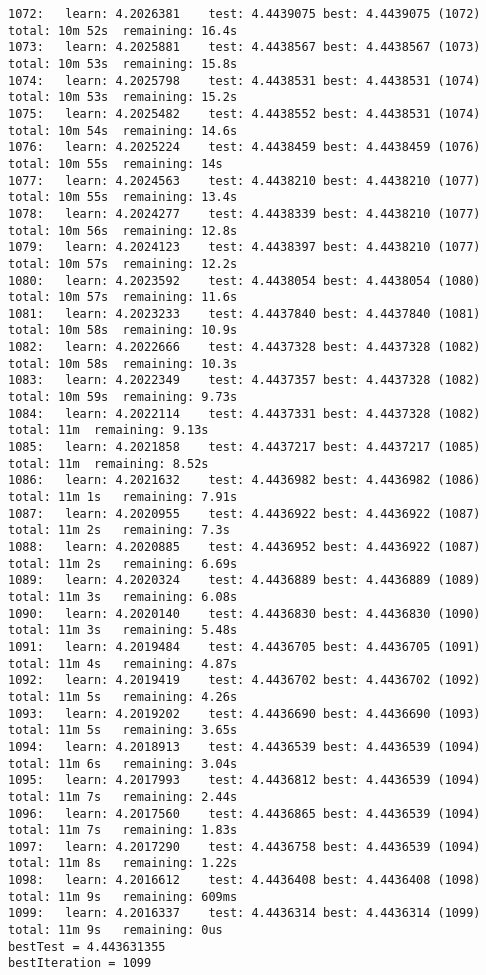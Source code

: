 \documentclass[11pt]{article}
\begin{document}
\begin{Verbatim}[commandchars=\\\{\}]
1072:	learn: 4.2026381	test: 4.4439075	best: 4.4439075 (1072)	total: 10m 52s	remaining: 16.4s
1073:	learn: 4.2025881	test: 4.4438567	best: 4.4438567 (1073)	total: 10m 53s	remaining: 15.8s
1074:	learn: 4.2025798	test: 4.4438531	best: 4.4438531 (1074)	total: 10m 53s	remaining: 15.2s
1075:	learn: 4.2025482	test: 4.4438552	best: 4.4438531 (1074)	total: 10m 54s	remaining: 14.6s
1076:	learn: 4.2025224	test: 4.4438459	best: 4.4438459 (1076)	total: 10m 55s	remaining: 14s
1077:	learn: 4.2024563	test: 4.4438210	best: 4.4438210 (1077)	total: 10m 55s	remaining: 13.4s
1078:	learn: 4.2024277	test: 4.4438339	best: 4.4438210 (1077)	total: 10m 56s	remaining: 12.8s
1079:	learn: 4.2024123	test: 4.4438397	best: 4.4438210 (1077)	total: 10m 57s	remaining: 12.2s
1080:	learn: 4.2023592	test: 4.4438054	best: 4.4438054 (1080)	total: 10m 57s	remaining: 11.6s
1081:	learn: 4.2023233	test: 4.4437840	best: 4.4437840 (1081)	total: 10m 58s	remaining: 10.9s
1082:	learn: 4.2022666	test: 4.4437328	best: 4.4437328 (1082)	total: 10m 58s	remaining: 10.3s
1083:	learn: 4.2022349	test: 4.4437357	best: 4.4437328 (1082)	total: 10m 59s	remaining: 9.73s
1084:	learn: 4.2022114	test: 4.4437331	best: 4.4437328 (1082)	total: 11m	remaining: 9.13s
1085:	learn: 4.2021858	test: 4.4437217	best: 4.4437217 (1085)	total: 11m	remaining: 8.52s
1086:	learn: 4.2021632	test: 4.4436982	best: 4.4436982 (1086)	total: 11m 1s	remaining: 7.91s
1087:	learn: 4.2020955	test: 4.4436922	best: 4.4436922 (1087)	total: 11m 2s	remaining: 7.3s
1088:	learn: 4.2020885	test: 4.4436952	best: 4.4436922 (1087)	total: 11m 2s	remaining: 6.69s
1089:	learn: 4.2020324	test: 4.4436889	best: 4.4436889 (1089)	total: 11m 3s	remaining: 6.08s
1090:	learn: 4.2020140	test: 4.4436830	best: 4.4436830 (1090)	total: 11m 3s	remaining: 5.48s
1091:	learn: 4.2019484	test: 4.4436705	best: 4.4436705 (1091)	total: 11m 4s	remaining: 4.87s
1092:	learn: 4.2019419	test: 4.4436702	best: 4.4436702 (1092)	total: 11m 5s	remaining: 4.26s
1093:	learn: 4.2019202	test: 4.4436690	best: 4.4436690 (1093)	total: 11m 5s	remaining: 3.65s
1094:	learn: 4.2018913	test: 4.4436539	best: 4.4436539 (1094)	total: 11m 6s	remaining: 3.04s
1095:	learn: 4.2017993	test: 4.4436812	best: 4.4436539 (1094)	total: 11m 7s	remaining: 2.44s
1096:	learn: 4.2017560	test: 4.4436865	best: 4.4436539 (1094)	total: 11m 7s	remaining: 1.83s
1097:	learn: 4.2017290	test: 4.4436758	best: 4.4436539 (1094)	total: 11m 8s	remaining: 1.22s
1098:	learn: 4.2016612	test: 4.4436408	best: 4.4436408 (1098)	total: 11m 9s	remaining: 609ms
1099:	learn: 4.2016337	test: 4.4436314	best: 4.4436314 (1099)	total: 11m 9s	remaining: 0us
bestTest = 4.443631355
bestIteration = 1099

    \end{Verbatim}
\end{document}
